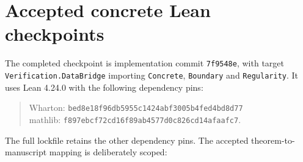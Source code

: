 \section{Accepted concrete Lean checkpoints}\label{sec:formal-results}
The completed checkpoint is implementation commit \texttt{7f9548e},
with target \nolinkurl{Verification.DataBridge} importing
\texttt{Concrete}, \texttt{Boundary} and \texttt{Regularity}.
It uses Lean 4.24.0 with the following dependency pins:
\begin{quote}
Wharton: \nolinkurl{bed8e18f96db5955c1424abf3005b4fed4bd8d77}\\
mathlib: \nolinkurl{f897ebcf72cd16f89ab4577d0c826cd14afaafc7}.
\end{quote}
The full lockfile retains the other dependency pins.
The accepted theorem-to-manuscript mapping is deliberately scoped:
